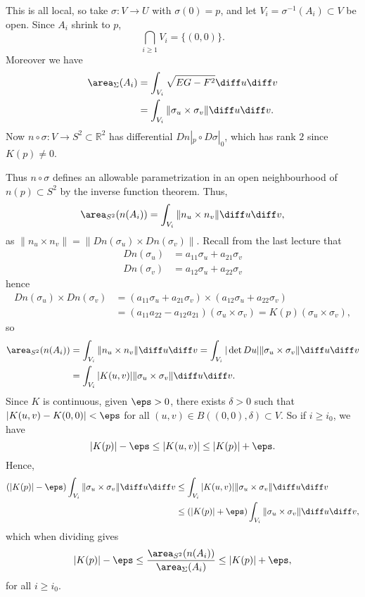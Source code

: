 \documentclass[12pt]{article}
\begin{document}
\begin{proofbox}
	This is all local, so take $\sigma : V \to U$ with $\sigma(0) = p$, and let $V_i = \sigma^{-1}(A_i) \subset V$ be open. Since $A_i$ shrink to $p$,
	\[
		\bigcap_{i \geq 1} V_i = \{(0,0)\}.
	\]
	Moreover we have
	\begin{align*}
		\area_{\Sigma}(A_i) &= \int_{V_i} \sqrt{EG-F^2} \diff u \diff v \\
				    &= \int_{V_i} \|\sigma_u \times \sigma_v\| \diff u \diff v.
	\end{align*}
	Now $n \circ \sigma : V \to S^2 \subset \mathbb{R}^2$ has differential $Dn|_p \circ D\sigma|_0$, which has rank $2$ since $K(p) \neq 0$.

	Thus $n \circ \sigma$ defines an allowable parametrization in an open neighbourhood of $n(p) \subset S^2$ by the inverse function theorem. Thus,
	\[
	\area_{S^2}(n(A_i)) = \int_{V_i} \|n_u \times n_v \| \diff u \diff v,
	\]
	as $\|n_u \times n_v\| = \|Dn(\sigma_u) \times Dn(\sigma_v)\|$. Recall from the last lecture that
	\begin{align*}
		Dn(\sigma_u) &= a_{11} \sigma_u + a_{21} \sigma_v \\
		Dn(\sigma_v) &= a_{12} \sigma_u + a_{22} \sigma_v
	\end{align*}
	hence
	\begin{align*}
		Dn(\sigma_u) \times Dn(\sigma_v) &= (a_{11} \sigma_u + a_{21} \sigma_v) \times (a_{12}\sigma_u + a_{22}\sigma_v) \\
						 &= (a_{11}a_{22} - a_{12}a_{21})(\sigma_u \times \sigma_v)  = K(p)(\sigma_u \times \sigma_v),
	\end{align*}
	so
	\begin{align*}
		\area_{S^2}(n(A_i)) &= \int_{V_i} \|n_u \times n_v\| \diff u \diff v = \int_{V_i}|\det Du|\|\sigma_u \times \sigma_v\| \diff u \diff v \\
				    &= \int_{V_i}|K(u,v)|\|\sigma_u \times \sigma_v\| \diff u \diff v.
	\end{align*}
	Since $K$ is continuous, given $\eps > 0$, there exists $\delta > 0$ such that $|K(u,v) - K(0,0)| < \eps$ for all $(u, v) \in B((0,0), \delta) \subset V$. So if $i \geq i_0$, we have
	\[
	|K(p)| - \eps \leq |K(u,v)| \leq |K(p)| + \eps.
	\]
	Hence,
	\begin{align*}
		(|K(p)|-\eps)\int_{V_i} \|\sigma_u \times \sigma_v\| \diff u \diff v &\leq \int_{V_i}|K(u,v)|\|\sigma_u \times \sigma_v\| \diff u \diff v \\
										     &\leq (|K(p)| + \eps) \int_{V_i} \|\sigma_u \times \sigma_v\| \diff u \diff v,
	\end{align*}
	which when dividing gives
	\[
	|K(p)| - \eps \leq \frac{\area_{S^2}(n(A_i))}{\area_{\Sigma}(A_i)}\leq |K(p)| + \eps,
	\]
	for all $i \geq i_0$.
\end{proofbox}


\newpage

\printindex
\end{document}
